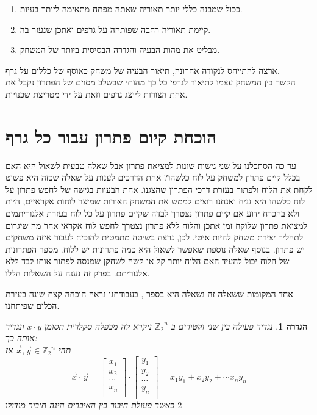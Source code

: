 \documentclass[12pt,leqno]{article}
\newtheorem{definition}{הגדרה}[section]
\newcommand{\Zn}{{\mathbb{Z}_2}^n}
\begin{document}
\begin{enumerate}
    \item 
    ככול שמבנה כללי יותר תאוריה שאתה מפתח מתאימה ליותר בעיות.
    \item 
    קיימת תאוריה רחבה שפותחה על גרפים ואתכן שנעזר בה.
    \item 
    מבליט את מהות הבעיה והגדרה הבסיסית ביותר של המשחק.
\end{enumerate}

ארצה להתייחס לנקודה אחרונה, תיאור הבעיה של משחק
כאוסף של כללים על גרף.
\\
הקשר בין המשחק עצמו לתיאור לגרפי כל כך מהותי
שבשלב מסוים של הפתרון נקבל את אחת הצורות לייצג גרפים וזאת על ידי מטריצת שכנויות.

\newpage
\section{הוכחת  קיום פתרון עבור כל גרף}
עד כה הסתכלנו על שני גישות שונות למציאת פתרון
אבל שאלה טבעית לשאול היא האם בכלל קיים פתרון למשחק על לוח כלשהו?
אחת הדרכים לענות על שאלה שכזה היא פשוט לקחת את הלוח ולפתור בעזרת 
דרכי הפתרון שהצגנו.
אחת הבעיות בגישה של לחפש פתרון על לוח כלשהו היא 
נניח ואנחנו רוצים לממש את המשחק האורות שמיצר לוחות אקראיים, היות ולא בהכרח ידוע אם קיים פתרון 
נצטרך לבדה שקיים פתרון על כל לוח בעזרת אלגוריתמים למציאת פתרון שלוקח זמן 
אתכן והלוח ללא פתרון נצטרך לחפש לוח אקראי אחר
מה שיגרום לתהליך יצירת משחק להיות איטי.
לכן, נרצה בשיטה מתמטית להוכיח לעבור איזה משחקים יש פתרון.
בנוסף שאלה נוספת שאפשר לשאול היא כמה פתרונות יש ללוח.
מספר הפתרונות של הלוח יכול להעיד האם הלוח יותר קל או קשה לשחקן שמנסה לפתור אותו
לבד ללא אלגוריתם.
בפרק זה נענה על השאלות הללו.

אחד המקומות ששאלה זה נשאלה היא בספר 
\cite{B3},
בעבודתנו נראה הוכחה קצת שונה בעזרת הכלים שפיתחנו.

\begin{definition}
    \label{def:inner_mul}
    נגדיר פעולה 
    בין שני וקטורים ב
    $\Zn$
    ניקרא לה מכפלה סקלרית
    תסומן 
    $x \cdot y$
    ונגדיר אותה כך:
    \\
    תהי 
    $\vec{x}, \vec{y} \in \Zn$
    אז 
    \[
        \vec{x} \cdot \vec{y} = 
        \begin{bmatrix}
            x_1 \\
            x_2 \\
            \cdots \\
            x_n \\
        \end{bmatrix}
        \cdot 
        \begin{bmatrix}
            y_1 \\
            y_2 \\
            \cdots \\
            y_n \\
        \end{bmatrix}
        = 
        x_1 y_1 + x_2 y_2 + \cdots x_n y_n
    \]
    כאשר 
    פעולת חיבור בין האיברים 
    הינה 
    חיבור מודולו
    $2$
\end{definition}
\end{document}

